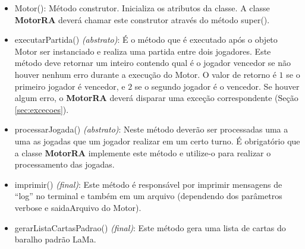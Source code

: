 \documentclass[10pt]{article}
\begin{document}
\begin{itemize}
    \item Motor(): Método construtor. Inicializa os atributos da classe. A classe \textbf{MotorRA} deverá chamar este construtor através do método super().
    \item executarPartida() \textit{(abstrato)}: É o método que é executado após o objeto Motor ser instanciado e realiza uma partida entre dois jogadores. Este método deve retornar um inteiro contendo qual é o jogador vencedor se não houver nenhum erro durante a execução do Motor. O valor de retorno é $1$ se o primeiro jogador é vencedor, e $2$ se o segundo jogador é o vencedor. Se houver algum erro, o \textbf{MotorRA} deverá disparar uma exceção correspondente (Seção \ref{sec:excecoes}).
    \item processarJogada() \textit{(abstrato)}: Neste método deverão ser processadas uma a uma as jogadas que um jogador realizar em um certo turno. É obrigatório que a classe \textbf{MotorRA} implemente este método e utilize-o para realizar o processamento das jogadas.
    \item imprimir() \textit{(final)}: Este método é responsável por imprimir mensagens de ``log'' no terminal e também em um arquivo (dependendo dos parâmetros verbose e saidaArquivo do Motor).
    \item gerarListaCartasPadrao()  \textit{(final)}: Este método gera uma lista de cartas do baralho padrão LaMa.
\end{itemize}
\end{document}
